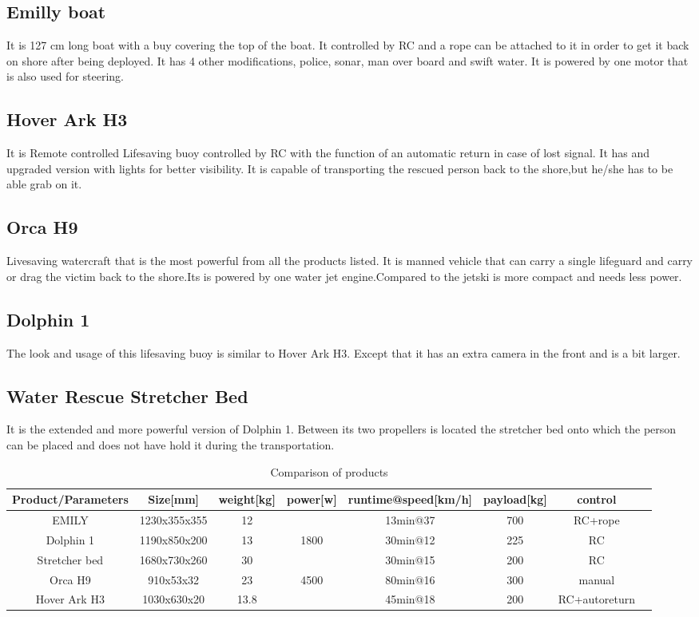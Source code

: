\subsection{Emilly boat }
It is 127 cm long boat with a buy covering the top of the boat. It controlled by RC and a rope can be attached to it in order to get it back on shore after being deployed. It has 4 other modifications, police, sonar, man over board and swift water. It is powered by one motor that is also used for steering.
\subsection{Hover Ark H3}
It is Remote controlled Lifesaving buoy controlled by RC with the function of an automatic return in case of lost signal. It has and upgraded version with lights for better visibility. It is capable of transporting the rescued person back to the shore,but he/she has to be able grab on it. 
\subsection{Orca H9}
Livesaving watercraft that is the most powerful from all the products listed. It is manned vehicle that can carry a single lifeguard and carry or drag the victim back to the shore.Its is powered by one water jet engine.Compared to the jetski is more compact and needs less power.
\subsection{Dolphin 1}
The look and usage of this lifesaving buoy is similar to Hover Ark H3. Except that it has an extra camera in the front and is a bit larger.
\subsection {Water Rescue Stretcher Bed}
It is the extended and more powerful version of Dolphin 1. Between its two propellers is located the stretcher bed onto which the person can be placed and does not have hold it during the transportation.


\begin{table}[h!]
    \centering
\begin{tabular}{|c|c|c|c|c|c|c|c| }
    
\hline
Product/Parameters & Size[mm] & weight[kg] & power[w] & runtime@speed[km/h] & payload[kg] & control  \\
\hline
EMILY & 1230x355x355 & 12 &  & 13min@37 & 700 & RC+rope \\
Dolphin 1 & 1190x850x200 & 13 & 1800 & 30min@12 & 225 & RC  \\
Stretcher bed &1680x730x260  & 30  &  & 30min@15 & 200  & RC  \\
Orca H9 & 910x53x32 & 23 & 4500& 80min@16  & 300 & manual \\
Hover Ark H3 & 1030x630x20 & 13.8 &  & 45min@18 & 200 & RC+autoreturn  \\
\hline



\hline
\end{tabular}
 \caption{Comparison of products }
    \label{tab:Comparison of products}

\end{table}
